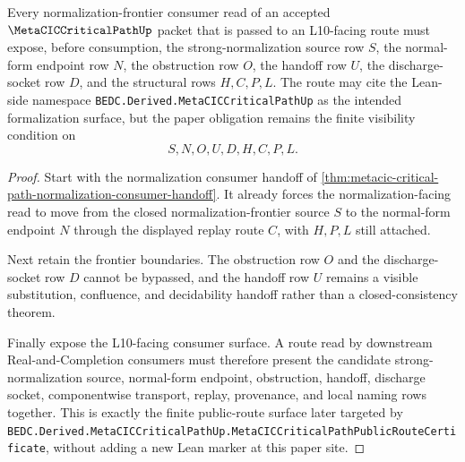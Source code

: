 \begin{theorem}
\label{thm:metacic-critical-path-normalization-frontier-consumer-route}
Every normalization-frontier consumer read of an accepted $\MetaCICCriticalPathUp$ packet that is passed to an L10-facing route must expose, before consumption, the strong-normalization source row $S$, the normal-form endpoint row $N$, the obstruction row $O$, the handoff row $U$, the discharge-socket row $D$, and the structural rows $H,C,P,L$. The route may cite the Lean-side namespace \texttt{BEDC.Derived.MetaCICCriticalPathUp} as the intended formalization surface, but the paper obligation remains the finite visibility condition on
$$
S,N,O,U,D,H,C,P,L.
$$
\end{theorem}
\begin{proof}
Start with the normalization consumer handoff of \autoref{thm:metacic-critical-path-normalization-consumer-handoff}. It already forces the normalization-facing read to move from the closed normalization-frontier source $S$ to the normal-form endpoint $N$ through the displayed replay route $C$, with $H,P,L$ still attached.

Next retain the frontier boundaries. The obstruction row $O$ and the discharge-socket row $D$ cannot be bypassed, and the handoff row $U$ remains a visible substitution, confluence, and decidability handoff rather than a closed-consistency theorem.

Finally expose the L10-facing consumer surface. A route read by downstream Real-and-Completion consumers must therefore present the candidate strong-normalization source, normal-form endpoint, obstruction, handoff, discharge socket, componentwise transport, replay, provenance, and local naming rows together. This is exactly the finite public-route surface later targeted by \texttt{BEDC.Derived.MetaCICCriticalPathUp.MetaCICCriticalPathPublicRouteCertificate}, without adding a new Lean marker at this paper site.
\end{proof}

